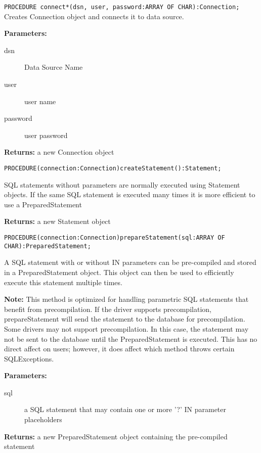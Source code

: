    
\verb'PROCEDURE connect*(dsn, user, password:ARRAY OF CHAR):Connection;'
   Creates Connection object and connects it to data source.

{\bf Parameters:} 
\begin{description}
\item[dsn] Data Source Name
\item[user] user name
\item[password] user password
\end{description}

     {\bf Returns:} 
          a new Connection object 


\verb'PROCEDURE(connection:Connection)createStatement():Statement;'

     SQL statements without parameters are normally executed using Statement objects. If the same SQL statement is executed
     many times it is more efficient to use a PreparedStatement 

     {\bf Returns:} 
          a new Statement object 

\verb'PROCEDURE(connection:Connection)prepareStatement(sql:ARRAY OF CHAR):PreparedStatement;'

     A SQL statement with or without IN parameters can be pre-compiled and stored in a PreparedStatement object. This object can
     then be used to efficiently execute this statement multiple times. 

     {\bf Note:} This method is optimized for handling parametric SQL statements that benefit from precompilation. If the driver supports
     precompilation, prepareStatement will send the statement to the database for precompilation. Some drivers may not support
     precompilation. In this case, the statement may not be sent to the database until the PreparedStatement is executed. This has
     no direct affect on users; however, it does affect which method throws certain SQLExceptions. 

     {\bf Parameters:} 
\begin{description}
\item[sql] a SQL statement that may contain one or more '?' IN parameter placeholders 
\end{description}

     {\bf Returns:} 
          a new PreparedStatement object containing the pre-compiled statement 

